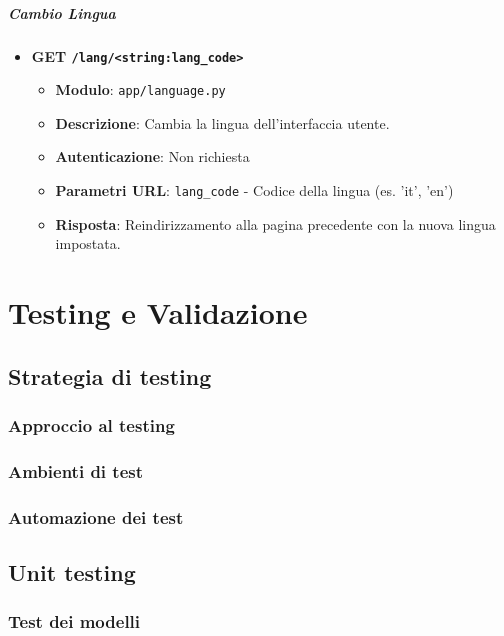 \documentclass[12pt,a4paper,oneside]{report}
\begin{document}
\paragraph{Cambio Lingua}
\begin{itemize}
    \item \textbf{GET \texttt{/lang/<string:lang\_code>}}
          \begin{itemize}
              \item \textbf{Modulo}: \texttt{app/language.py}
              \item \textbf{Descrizione}: Cambia la lingua dell'interfaccia utente.
              \item \textbf{Autenticazione}: Non richiesta
              \item \textbf{Parametri URL}: \texttt{lang\_code} - Codice della lingua (es. 'it', 'en')
              \item \textbf{Risposta}: Reindirizzamento alla pagina precedente con la nuova lingua impostata.
          \end{itemize}
\end{itemize}


\chapter{Testing e Validazione}
\section{Strategia di testing}
\subsection{Approccio al testing}

\subsection{Ambienti di test}

\subsection{Automazione dei test}

\section{Unit testing}
\subsection{Test dei modelli}
\end{document}
